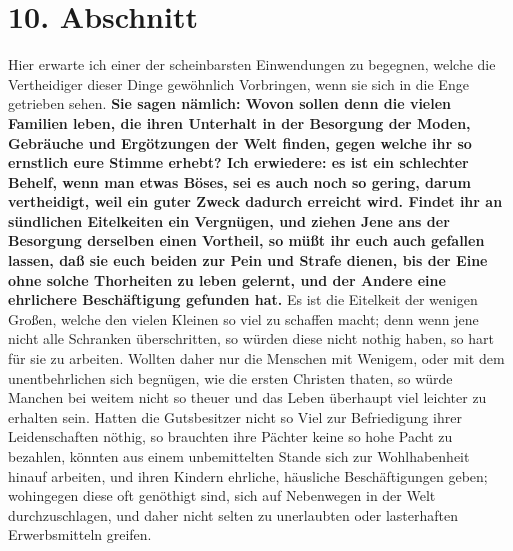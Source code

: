 {\section{10. Abschnitt} \label{kap17_ab10}

 Hier erwarte ich einer der scheinbarsten Einwendungen zu
begegnen, welche die
Vertheidiger dieser Dinge gewöhnlich Vorbringen, wenn sie sich in die Enge
getrieben sehen. \textbf{Sie sagen nämlich: Wovon sollen
denn die vielen Familien leben,
die ihren Unterhalt in der Besorgung der Moden, Gebräuche und Ergötzungen der
Welt finden, gegen welche ihr so ernstlich eure Stimme erhebt? Ich erwiedere: es
ist ein schlechter Behelf, wenn man etwas Böses, sei es auch noch so gering,
darum vertheidigt, weil ein guter Zweck dadurch erreicht wird. Findet ihr an
sündlichen Eitelkeiten ein Vergnügen, und ziehen Jene ans der Besorgung
derselben einen Vortheil, so müßt ihr euch auch gefallen lassen, daß sie euch
beiden zur Pein und Strafe dienen, bis der Eine ohne solche Thorheiten zu leben
gelernt, und der Andere eine ehrlichere Beschäftigung gefunden hat.} Es ist die
Eitelkeit der wenigen Großen, welche den vielen Kleinen so viel zu schaffen
macht; denn wenn jene nicht alle Schranken überschritten, so würden diese nicht
nothig haben, so hart für sie zu arbeiten. Wollten daher nur die Menschen mit
Wenigem, oder mit dem unentbehrlichen sich begnügen, wie die ersten Christen
thaten, so würde Manchen bei weitem nicht so theuer und das Leben überhaupt viel
leichter zu erhalten sein. Hatten die Gutsbesitzer nicht so Viel zur
Befriedigung ihrer Leidenschaften nöthig, so brauchten ihre Pächter keine so
hohe Pacht zu bezahlen, könnten aus einem unbemittelten Stande sich zur
Wohlhabenheit hinauf arbeiten, und ihren Kindern ehrliche, häusliche
Beschäftigungen geben; wohingegen diese oft genöthigt sind, sich auf Nebenwegen
in der Welt durchzuschlagen, und daher nicht selten zu unerlaubten oder
lasterhaften Erwerbsmitteln greifen.

\medskip

}
